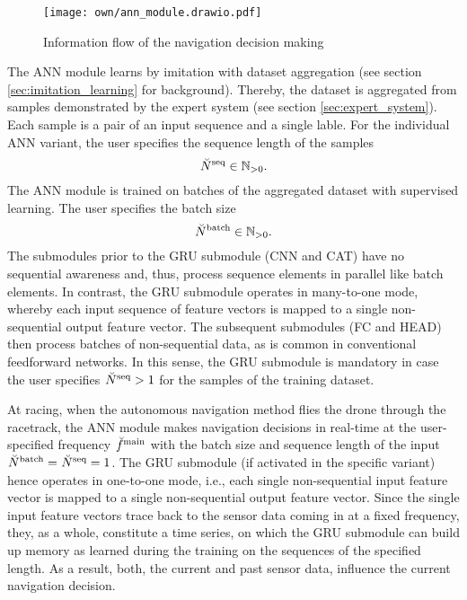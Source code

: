 \begin{figure}[h]
    \centering
    \texttt{[image: own/ann\_module.drawio.pdf]}
    \caption[
        Information flow of the navigation decision making
    ]{
        Information flow of the navigation decision making
    \label{fig:perception_and_reasoning}
    }
\end{figure}


The ANN module learns by
imitation with dataset aggregation
(see section \ref{sec:imitation_learning} for background).
Thereby, the dataset is aggregated from samples demonstrated by the expert
system (see section \ref{sec:expert_system}).
Each sample is a pair of an input sequence and a single lable.
For the individual ANN variant,
the user specifies the sequence length of the samples
\begin{equation} \label{eq:seq_len}
    {}_{}^{} \breve{N}^{\text{seq}}_{} \in \mathbb{N}_{>0}.
\end{equation}
The ANN module is trained on
batches of the aggregated dataset with supervised learning.
The user specifies the batch size
\begin{equation}
    {}_{}^{} \breve{N}^{\text{batch}}_{} \in \mathbb{N}_{>0}.
\end{equation}
The submodules prior to the GRU submodule (CNN and CAT)
have no sequential awareness and, thus, 
process sequence elements in parallel like batch elements.
In contrast, the GRU submodule
operates in many-to-one mode,
whereby each input sequence of feature vectors is mapped to a 
single non-sequential output feature vector.
The subsequent submodules (FC and HEAD)
then process batches of non-sequential data, 
as is common in conventional feedforward networks.
In this sense,
the GRU submodule is mandatory in case the user specifies
${}_{}^{} \breve{N}^{\text{seq}}_{} > 1$ for the samples of the training dataset.

At racing,
when the autonomous navigation method flies the drone through the racetrack,
the ANN module makes navigation decisions 
in real-time at the user-specified frequency
${}_{}^{} \breve{f}^{\text{main}}_{}$ with the batch size and sequence length 
of the input
${}_{}^{} \breve{N}^{\text{batch}}_{} = {}_{}^{} \breve{N}^{\text{seq}}_{} =1$.
The GRU submodule (if activated in the specific variant) 
hence operates in one-to-one mode,
i.e., 
each single non-sequential input feature vector
is mapped to a single non-sequential output feature vector.
Since the single input feature vectors 
trace back to the sensor data coming in at a fixed frequency,
they, as a whole, constitute a time series,
on which the GRU submodule can build up memory
as learned during the training on the sequences of the specified length.
As a result, both, the current and past sensor data, 
influence the current navigation decision.





